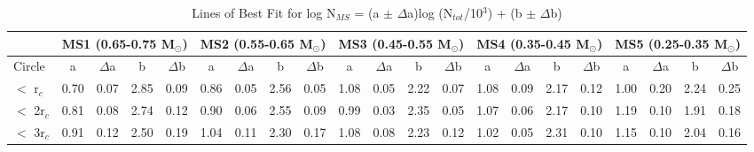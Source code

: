 \begin{table}
\tiny
\centering
\caption{Lines of Best Fit for log N$_{MS}$ = (a $\pm$ $\Delta$a)log (N$_{tot}$/10$^3$) + (b $\pm$ $\Delta$b)
  \label{table:bestfit6}}
\begin{tabular}{|l|cccc|cccc|cccc|cccc|cccc|}
\hline
      &\multicolumn{4}{c|}{   MS1 (0.65-0.75 M$_{\odot}$)  }&\multicolumn{4}{c|}{   MS2 (0.55-0.65 M$_{\odot}$)  }&\multicolumn{4}{c|}{   MS3 (0.45-0.55 M$_{\odot}$)  }&\multicolumn{4}{c|}{   MS4 (0.35-0.45 M$_{\odot}$)  }&\multicolumn{4}{c|}{   MS5 (0.25-0.35 M$_{\odot}$)  }\\
\hline
Circle & a & $\Delta$a & b & $\Delta$b & a &$\Delta$a & b & $\Delta$b
& a & $\Delta$a & b & $\Delta$b & a & $\Delta$a & b & $\Delta$b & a &
$\Delta$a & b & $\Delta$b \\
\hline
$<$ r$_c$    & 0.70 & 0.07 & 2.85 & 0.09 & 0.86 & 0.05 & 2.56 & 0.05 & 1.08 & 0.05 & 2.22 & 0.07 & 1.08 & 0.09 & 2.17 & 0.12 & 1.00 & 0.20 & 2.24 & 0.25 \\
$<$ 2r$_c$   & 0.81 & 0.08 & 2.74 & 0.12 & 0.90 & 0.06 & 2.55 & 0.09 & 0.99 & 0.03 & 2.35 & 0.05 & 1.07 & 0.06 & 2.17 & 0.10 & 1.19 & 0.10 & 1.91 & 0.18 \\
$<$ 3r$_c$   & 0.91 & 0.12 & 2.50 & 0.19 & 1.04 & 0.11 & 2.30 & 0.17 & 1.08 & 0.08 & 2.23 & 0.12 & 1.02 & 0.05 & 2.31 & 0.10 & 1.15 & 0.10 & 2.04 & 0.16 \\
%

\end{tabular}
\end{table}
